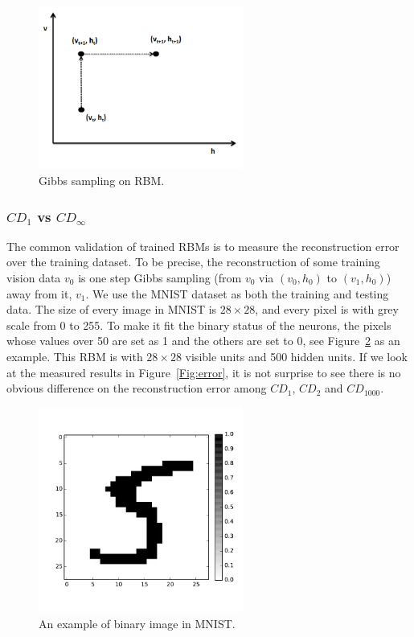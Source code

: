 	\begin{figure}[hbt]
		\centering
		\includegraphics[width=0.6\textwidth]{pics_sdbn/gibbs.png}
		\caption{Gibbs sampling on RBM.}
		\label{fig:gibbs}
	\end{figure}	
\subsubsection{$CD_1$ vs $CD_{\infty}$}
\label{sec:cd1}
The common validation of trained RBMs is to measure the reconstruction error over the training dataset.
To be precise, the reconstruction of some training vision data $ v_0 $ is one step Gibbs sampling (from $ v_0 $ via $ (v_0, h_0 )$ to $ (v_1, h_0 )$) away from it, $ v_1 $.
We use the MNIST dataset as both the training and testing data.
The size of every image in MNIST is $28 \times 28$, and every pixel is with grey scale from 0 to 255.
To make it fit the binary status of the neurons, the pixels whose values over 50 are set as 1 and the others are set to 0, see Figure~\ref{Fig:5} as an example.
This RBM is with $28 \times 28$ visible units and 500 hidden units.
If we look at the measured results in Figure~\ref{Fig:error}, it is not surprise to see there is no obvious difference on the reconstruction error among $CD_1$, $CD_2$ and $CD_{1000}$.

	\begin{figure}[hbt]
		\centering
		\includegraphics[width=0.6\textwidth]{pics_sdbn/test.pdf}
		\caption{An example of binary image in MNIST.}
		\label{Fig:5}
	\end{figure}

